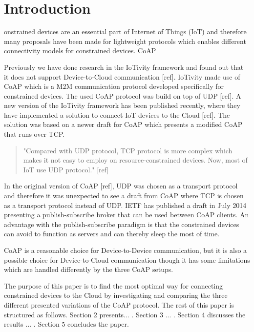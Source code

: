 \section{Introduction}
% 
% 
onstrained devices are an essential part of Internet of Things (IoT) and therefore many proposals have been made for lightweight protocols which enables different connectivity models for constrained devices.  
CoAP


Previously we have done research in the IoTivity framework and found out that it does not support Device-to-Cloud communication [ref].
IoTivity made use of CoAP which is a M2M communication protocol developed specifically for constrained devices.
The used CoAP protocol was build on top of UDP [ref].
A new version of the IoTivity framework has been published recently, where they have implemented a solution to connect IoT devices to the Cloud [ref]. The solution was based on a newer draft for CoAP which presents a modified CoAP that runs over TCP.

\begin{quote}
	"Compared with UDP protocol, TCP protocol is more complex which makes it not easy to employ on resource-constrained devices. Now, most of IoT use UDP protocol." [ref]
\end{quote}
In the original version of CoAP [ref], UDP was chosen as a transport protocol and therefore it was unexpected to see a draft from CoAP where TCP is chosen as a transport protocol instead of UDP.
IETF has published a draft in July 2014 presenting a publish-subscribe broker that can be used between CoAP clients. An advantage with the publish-subscribe paradigm is that the constrained devices can avoid to function as servers and can thereby sleep the most of time.

CoAP is a reasonable choice for Device-to-Device communication,  but it is also a possible choice for Device-to-Cloud communication though it has some limitations which are handled differently by the three CoAP setups.

The purpose of this paper is to find the most optimal way for connecting constrained devices to the Cloud by investigating and comparing the three different presented variations of the CoAP protocol. The rest of this paper is structured as follows.  Section 2 presents... . Section 3 ... . Section 4 discusses the results ... . Section 5 concludes the paper.     
